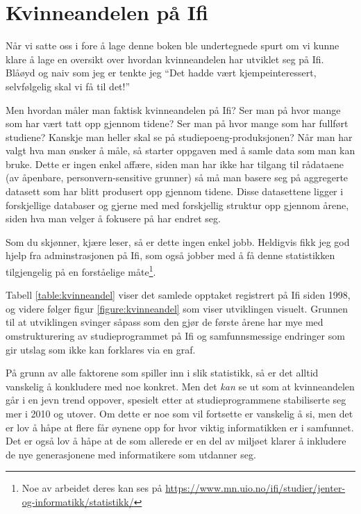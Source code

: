 \chapter{Kvinneandelen på Ifi}

\label{chap:kvinneandelen}

\author{Skrevet av Arne Hassel, med god hjelp fra administrasjonen på Ifi ved Eli Berge}

Når vi satte oss i fore å lage denne boken ble undertegnede spurt om vi kunne klare å lage en oversikt over hvordan kvinneandelen har utviklet seg på Ifi. Blåøyd og naiv som jeg er tenkte jeg ``Det hadde vært kjempeinteressert, selvfølgelig skal vi få til det!'' 

Men hvordan måler man faktisk kvinneandelen på Ifi? Ser man på hvor mange som har vært tatt opp gjennom tidene? Ser man på hvor mange som har fullført studiene? Kanskje man heller skal se på studiepoeng-produksjonen? Når man har valgt hva man ønsker å måle, så starter oppgaven med å samle data som man kan bruke. Dette er ingen enkel affære, siden man har ikke har tilgang til rådataene (av åpenbare, personvern-sensitive grunner) så må man basere seg på aggregerte datasett som har blitt produsert opp gjennom tidene. Disse datasettene ligger i forskjellige databaser og gjerne med med forskjellig struktur opp gjennom årene, siden hva man velger å fokusere på har endret seg.

Som du skjønner, kjære leser, så er dette ingen enkel jobb. Heldigvis fikk jeg god hjelp fra adminstrasjonen på Ifi, som også jobber med å få denne statistikken tilgjengelig på en forståelige måte\footnote{Noe av arbeidet deres kan ses på \url{https://www.mn.uio.no/ifi/studier/jenter-og-informatikk/statistikk/}}.

Tabell \ref{table:kvinneandel} viser det samlede opptaket registrert på Ifi siden 1998, og videre følger figur \ref{figure:kvinneandel} som viser utviklingen visuelt. Grunnen til at utviklingen svinger såpass som den gjør de første årene har mye med omstrukturering av studieprogrammet på Ifi og samfunnsmessige endringer som gir utslag som ikke kan forklares via en graf.

På grunn av alle faktorene som spiller inn i slik statistikk, så er det alltid vanskelig å konkludere med noe konkret. Men det \textit{kan} se ut som at kvinneandelen går i en jevn trend oppover, spesielt etter at studieprogrammene stabiliserte seg mer i 2010 og utover. Om dette er noe som vil fortsette er vanskelig å si, men det er lov å håpe at flere får øynene opp for hvor viktig informatikken er i samfunnet. Det er også lov å håpe at de som allerede er en del av miljøet klarer å inkludere de nye generasjonene med informatikere som utdanner seg.

